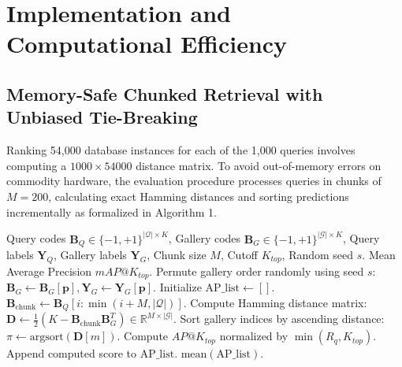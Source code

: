 \documentclass[10pt,conference]{IEEEtran}
\begin{document}
\section{Implementation and Computational Efficiency}

\subsection{Memory-Safe Chunked Retrieval with Unbiased Tie-Breaking}
Ranking 54,000 database instances for each of the 1,000 queries involves computing a $1000 \times 54000$ distance matrix. To avoid out-of-memory errors on commodity hardware, the evaluation procedure processes queries in chunks of $M = 200$, calculating exact Hamming distances and sorting predictions incrementally as formalized in Algorithm 1.

\begin{algorithm}[h]
\caption{Memory-Safe Chunked mAP Evaluation with Unbiased Tie-Breaking}
\label{alg:chunked_map}
\begin{algorithmic}[1]
\Require Query codes $\mathbf{B}_Q \in \{-1, +1\}^{|\mathcal{Q}| \times K}$, Gallery codes $\mathbf{B}_G \in \{-1, +1\}^{|\mathcal{G}| \times K}$, Query labels $\mathbf{Y}_Q$, Gallery labels $\mathbf{Y}_G$, Chunk size $M$, Cutoff $K_{top}$, Random seed $s$.
\Ensure Mean Average Precision $mAP@K_{top}$.
\State Permute gallery order randomly using seed $s$: $\mathbf{B}_G \leftarrow \mathbf{B}_G[\mathbf{p}], \mathbf{Y}_G \leftarrow \mathbf{Y}_G[\mathbf{p}]$.
\State Initialize $\text{AP\_list} \leftarrow []$.
    \State $\mathbf{B}_{\text{chunk}} \leftarrow \mathbf{B}_Q[i : \min(i + M, |\mathcal{Q}|)]$.
    \State Compute Hamming distance matrix:
    \State $\mathbf{D} \leftarrow \frac{1}{2}(K - \mathbf{B}_{\text{chunk}} \mathbf{B}_G^T) \in \mathbb{R}^{M \times |\mathcal{G}|}$.
        \State Sort gallery indices by ascending distance: $\pi \leftarrow \mathrm{argsort}(\mathbf{D}[m])$.
        \State Compute $AP@K_{top}$ normalized by $\min(R_q, K_{top})$.
        \State Append computed score to $\text{AP\_list}$.
    \EndFor
\EndFor
\State \Return $\mathrm{mean}(\text{AP\_list})$.
\end{algorithmic}
\end{algorithm}
\end{document}
